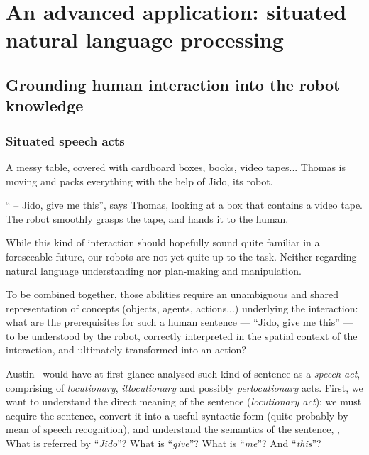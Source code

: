\chapter{An advanced application: situated natural language processing}
\label{chapt|dialogs}



\section{Grounding human interaction into the robot knowledge}
\label{sect|dialogs}

\subsection{Situated speech acts}
\label{intro_example}

A messy table, covered with cardboard boxes, books, video tapes... Thomas is
moving and packs everything with the help of Jido, its robot.

`` -- Jido, give me this'', says Thomas, looking at a box that contains a video
tape. The robot smoothly grasps the tape, and hands it to the human.

While this kind of interaction should hopefully sound quite familiar in a
foreseeable future, our robots are not yet quite up to the task. Neither
regarding natural language understanding nor plan-making and manipulation.

To be combined together, those abilities require an unambiguous and shared
representation of concepts (objects, agents, actions...) underlying the
interaction: what are the prerequisites for such a
human sentence --- ``Jido, give me this'' --- to be understood by the robot,
correctly interpreted in the spatial context of the interaction, and ultimately
transformed into an action?

Austin~\cite{Austin1962} would have at first glance analysed such kind of
sentence as a \emph{speech act}, comprising of \emph{locutionary},
\emph{illocutionary} and possibly \emph{perlocutionary} acts. First, we want to
understand the direct meaning of the sentence (\emph{locutionary act}): we must
acquire the sentence, convert it into a useful syntactic form (quite probably
by mean of speech recognition), and understand the semantics of the sentence,
\ie, What is referred by ``\textit{Jido}''? What is ``\textit{give}''? What is
``\textit{me}''? And ``\textit{this}''?

